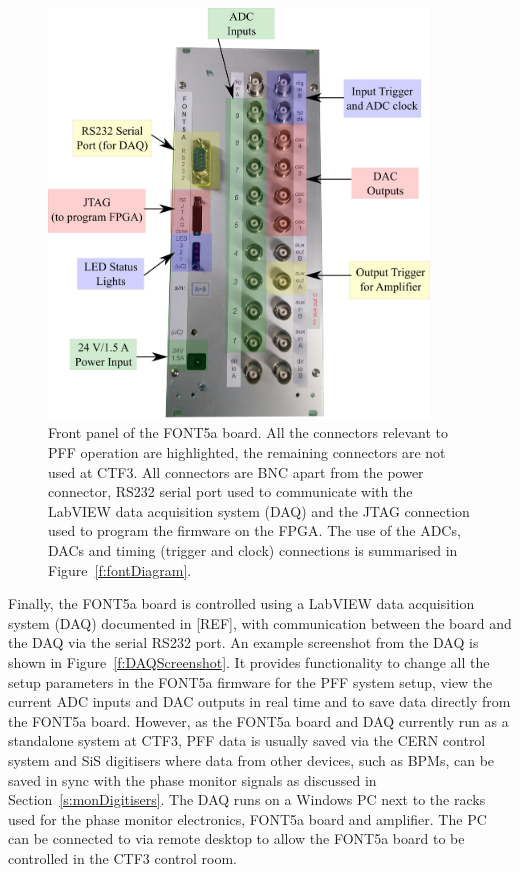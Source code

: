 \begin{figure}
  \centering
  \includegraphics[width=0.9\textwidth]{Figures/commissioning/FONT5aPanelPic}
  \caption{Front panel of the FONT5a board. All the connectors relevant to PFF operation are highlighted, the remaining connectors are not used at CTF3. All connectors are BNC apart from the power connector, RS232 serial port used to communicate with the LabVIEW data acquisition system (DAQ) and the JTAG connection used to program the firmware on the FPGA. The use of the ADCs, DACs and timing (trigger and clock) connections is summarised in Figure~\ref{f:fontDiagram}. }
  \label{f:FONT5aPanelPic}
\end{figure}

Finally, the FONT5a board is controlled using a LabVIEW data acquisition system (DAQ) documented in [REF], with communication between the board and the DAQ via the serial RS232 port. An example screenshot from the DAQ is shown in Figure~\ref{f:DAQScreenshot}. It provides functionality to change all the setup parameters in the FONT5a firmware for the PFF system setup, view the current ADC inputs and DAC outputs in real time and to save data directly from the FONT5a board. However, as the FONT5a board and DAQ currently run as a standalone system at CTF3, PFF data is usually saved via the CERN control system and SiS digitisers where data from other devices, such as BPMs, can be saved in sync with the phase monitor signals as discussed in Section~\ref{s:monDigitisers}. The DAQ runs on a Windows PC next to the racks used for the phase monitor electronics, FONT5a board and amplifier. The PC can be connected to via remote desktop to allow the FONT5a board to be controlled in the CTF3 control room.

